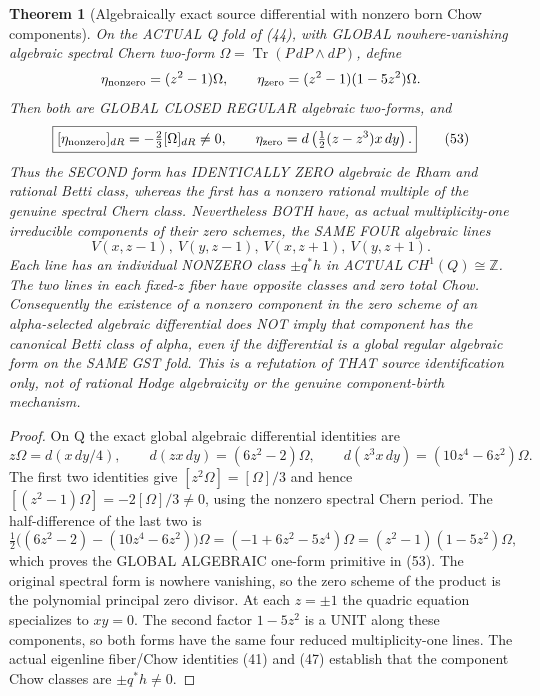 \documentclass[11pt]{article}
\newtheorem{theorem}{Theorem}[section]
\begin{document}
\begin{theorem}[Algebraically exact source differential with nonzero born Chow components]
On the ACTUAL Q fold of (44), with GLOBAL nowhere-vanishing
algebraic spectral Chern two-form
$\Omega=\operatorname{Tr}(P\,dP\wedge dP)$, define
\[
 \eta_{\rm nonzero}=(z^2-1)\Omega,\qquad
 \eta_{\rm zero}=(z^2-1)(1-5z^2)\Omega .
\]
Then both are GLOBAL CLOSED REGULAR algebraic
two-forms, and
\[
 \boxed{
 [\eta_{\rm nonzero}]_{dR}
      =-\tfrac23[\Omega]_{dR}\ne0,\qquad
 \eta_{\rm zero}
      =d\left(\tfrac12(z-z^3)x\,dy\right).
 }                                                         \tag{53}
\]
Thus the SECOND form has IDENTICALLY ZERO
algebraic de Rham and rational Betti class,
whereas the first has a nonzero rational
multiple of the genuine spectral Chern class.
Nevertheless BOTH have, as actual multiplicity-one
irreducible components of their zero schemes,
the SAME FOUR algebraic lines
\[
 V(x,z-1),\ V(y,z-1),\
 V(x,z+1),\ V(y,z+1).
\]
Each line has an individual NONZERO
class $\pm q^*h$ in ACTUAL
$CH^1(Q)\cong\mathbb Z$.
The two lines in each fixed-$z$ fiber
have opposite classes and zero total Chow.
Consequently the existence of a nonzero
component in the zero scheme of an
alpha-selected algebraic differential
does NOT imply that component has the
canonical Betti class of alpha, even if
the differential is a global regular
algebraic form on the SAME GST fold.
This is a refutation of THAT source
identification only, not of rational
Hodge algebraicity or the genuine
component-birth mechanism.
\end{theorem}
\begin{proof}
On Q the exact global algebraic differential
identities are
\[
 z\Omega=d(x\,dy/4),\qquad
 d(zx\,dy)=(6z^2-2)\Omega,\qquad
 d(z^3x\,dy)=(10z^4-6z^2)\Omega .
\]
The first two identities give
$[z^2\Omega]=[\Omega]/3$ and hence
$[(z^2-1)\Omega]=-2[\Omega]/3\ne0$,
using the nonzero spectral Chern period.
The half-difference of the last two is
\[
 \tfrac12\big((6z^2-2)-(10z^4-6z^2)\big)\Omega
   =(-1+6z^2-5z^4)\Omega
   =(z^2-1)(1-5z^2)\Omega,
\]
which proves the GLOBAL ALGEBRAIC
one-form primitive in (53).
The original spectral form is nowhere
vanishing, so the zero scheme of the
product is the polynomial principal
zero divisor. At each $z=\pm1$ the
quadric equation specializes to $xy=0$.
The second factor $1-5z^2$ is a
UNIT along these components, so
both forms have the same four
reduced multiplicity-one lines.
The actual eigenline fiber/Chow
identities (41) and (47) establish
that the component Chow classes
are $\pm q^*h\ne0$.
\end{proof}
\end{document}
